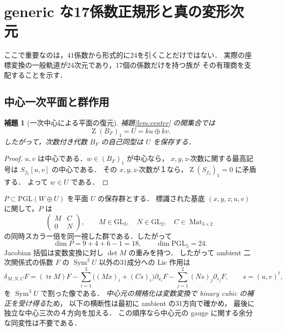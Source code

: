 \documentclass[11pt,a4paper]{ltjsarticle}
\numberwithin{equation}{section}
\newtheorem{lemma}[theorem]{補題}
\newcommand{\Sym}{\operatorname{Sym}}
\newcommand{\GL}{\mathrm{GL}}
\newcommand{\PGL}{\mathrm{PGL}}
\newcommand{\Z}{\operatorname{Z}}
\begin{document}
\section{generic な17係数正規形と真の変形次元}\label{sec:normal}
ここで重要なのは，41係数から形式的に24を引くことだけではない．
実際の座標変換の一般軌道が24次元であり，17個の係数だけを持つ族が
その有理商を支配することを示す．

\subsection{中心一次平面と群作用}
\begin{lemma}[一次中心による平面の復元]\label{lem:U}
補題\ref{lem:center} の開集合では
\begin{equation}\label{eq:Z1}
 \Z(B_F)_1=U=ku\oplus kv.
\end{equation}
したがって，次数付き代数 $B_F$ の自己同型は $U$ を保存する．
\end{lemma}
\begin{proof}
$u,v$ は中心である．$w\in (B_F)_1$ が中心なら，
$x,y,z$-次数に関する最高記号は $S_{f_3}[u,v]$ の中心である．
その $x,y,z$-次数が１なら，$\Z(S_{f_3})_1=0$ に矛盾する．
よって $w\in U$ である．
\end{proof}

$P\subset\PGL(W\oplus U)$ を平面 $U$ の保存群とする．
標識された基底 $(x,y,z;u,v)$ に関して，$P$ は
\[
 \left(\begin{array}{cc}M&C\\0&N\end{array}\right),\qquad
 M\in\GL_3,\quad N\in\GL_2,\quad C\in\operatorname{Mat}_{3\times2}
\]
の同時スカラー倍を同一視した群である．したがって
\begin{equation}\label{eq:dimP}
 \dim P=9+4+6-1=18,
 \qquad\dim\PGL_5=24.
\end{equation}
Jacobian 括弧は変数変換に対し $\det M$ の重みを持つ．
したがって ambient 二次関係式の係数 $F$ の
$\Sym^3U$ 以外の31成分への Lie 作用は
\begin{equation}\label{eq:Lie}
 \delta_{M,N,C}F=(\operatorname{tr}M)F
 -\sum_{i=1}^{3}\bigl((Mx)_i+(Cs)_i\bigr)\partial_{x_i}F
 -\sum_{j=1}^{2}(Ns)_j\partial_{s_j}F,
 \qquad s=(u,v)^t,
\end{equation}
を $\Sym^3U$ で割った像である．
\emph{中心元の規格化は変数変換で binary cubic の補正を受け得る}ため，
以下の横断性は最初に ambient の31方向で確かめ，
最後に独立な中心三次の４方向を加える．
この順序なら中心元の gauge に関する余分な同変性は不要である．
\end{document}
